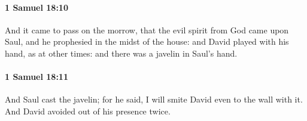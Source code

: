 		\paragraph{1 Samuel 18:10} %
			\label{1SAMUEL-18-10}

			And it came to pass on the morrow, that the evil spirit from God came upon Saul, and he prophesied in the midst of the house: and David played with his hand, as at other times: and there was a javelin in Saul’s hand.


		\paragraph{1 Samuel 18:11} %
			\label{1SAMUEL-18-11}

			And Saul cast the javelin; for he said, I will smite David even to the wall with it. And David avoided out of his presence twice.


